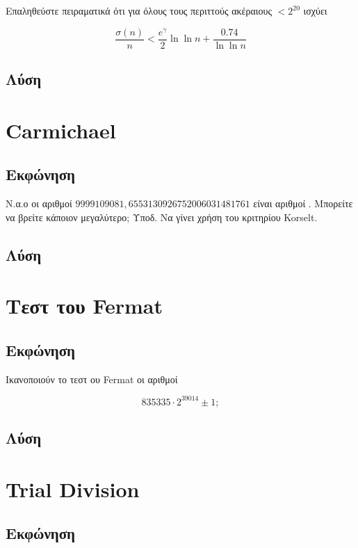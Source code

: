 \documentclass[oneside]{article}
\begin{document}
Επαληθεύστε πειραματικά ότι για όλους τους περιττούς ακέραιους $< 2^{20}$ ισχύει

\begin{equation}\label{eq:611}
    \frac{\sigma(n)}{n} < \frac{e^{\gamma}}{2}\ln{\ln{n}} + \frac{0.74}{\ln{\ln{n}}}
\end{equation}

\subsection{Λύση} 

\section{Carmichael}

\subsection{Εκφώνηση}

Ν.α.ο οι αριθμοί $9999109081, 6553130926752006031481761$ είναι αριθμοί . Μπορείτε να βρείτε κάποιον μεγαλύτερο;
Υποδ. Να γίνει χρήση του κριτηρίου Korselt.

\subsection{Λύση} 

\section{Τεστ του Fermat}

\subsection{Εκφώνηση}

Ικανοποιούν το τεστ ου Fermat οι αριθμοί

\[
    835335 \cdot 2^{39014} \pm 1;
\]

\subsection{Λύση} 

\section{Trial Division}

\subsection{Εκφώνηση}
\end{document}
